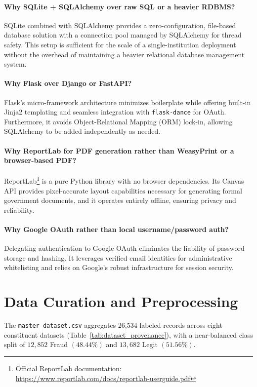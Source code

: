 \paragraph{Why SQLite + SQLAlchemy over raw SQL or a heavier RDBMS?}
SQLite combined with SQLAlchemy provides a zero-configuration, file-based database solution with a connection pool managed by SQLAlchemy for thread safety. This setup is sufficient for the scale of a single-institution deployment without the overhead of maintaining a heavier relational database management system.

\paragraph{Why Flask over Django or FastAPI?}
Flask's micro-framework architecture \cite{grinberg2018flask} minimizes boilerplate while offering built-in Jinja2 templating and seamless integration with \texttt{flask-dance} for OAuth. Furthermore, it avoids Object-Relational Mapping (ORM) lock-in, allowing SQLAlchemy to be added independently as needed.

\paragraph{Why ReportLab for PDF generation rather than WeasyPrint or a browser-based PDF?}
ReportLab\footnote{Official ReportLab documentation: \url{https://www.reportlab.com/docs/reportlab-userguide.pdf}} is a pure Python library with no browser dependencies. Its Canvas API provides pixel-accurate layout capabilities necessary for generating formal government documents, and it operates entirely offline, ensuring privacy and reliability.

\paragraph{Why Google OAuth rather than local username/password auth?}
Delegating authentication to Google OAuth eliminates the liability of password storage and hashing. It leverages verified email identities for administrative whitelisting and relies on Google's robust infrastructure for session security.

\section{Data Curation and Preprocessing}
The \texttt{master\_dataset.csv} aggregates 26,534 labeled records across eight constituent datasets (Table~\ref{tab:dataset_provenance}), with a near-balanced class split of $12,852$ Fraud $(48.44\%)$ and $13,682$ Legit $(51.56\%)$.

